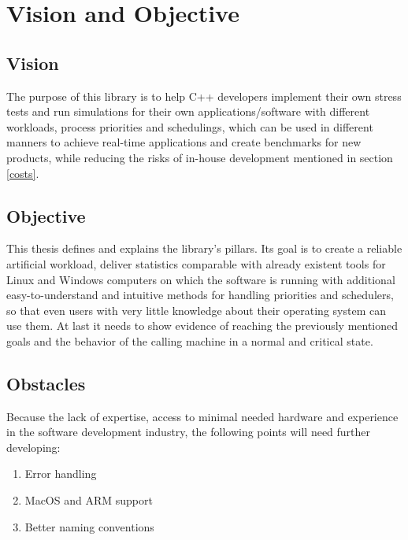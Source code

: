 \section{Vision and Objective}
\subsection{Vision}
The purpose of this library is to help C++ developers implement their own stress tests and run simulations for their own applications/software with different workloads, process priorities and schedulings, which can be used in different manners to achieve real-time applications and create benchmarks for new products, while reducing the risks of in-house development mentioned in section \ref{costs}.
\subsection{Objective}
\label{objective}
This thesis defines and explains the library's pillars. Its goal is to create a reliable artificial workload, deliver statistics comparable with already existent tools for Linux and Windows computers on which the software is running with additional easy-to-understand and intuitive methods for handling priorities and schedulers, so that even users with very little knowledge about their operating system can use them. At last it needs to show evidence of reaching the previously mentioned goals and the behavior of the calling machine in a normal and critical state.  
\subsection{Obstacles}
Because the lack of expertise, access to minimal needed hardware and experience in the software development industry, the following points will need further developing:
\begin{enumerate}
	\item Error handling
	\item MacOS and ARM support
	\item Better naming conventions
\end{enumerate}

